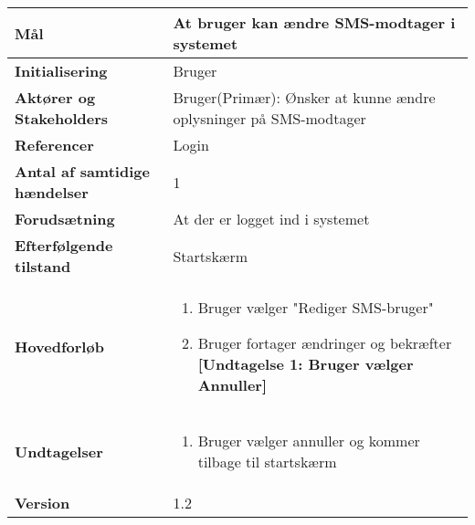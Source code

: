 \begin{table}[H] \centering
\begin{tabular}{|p{6cm}|p{8cm}|}
	\hline
\textbf{Mål} &
At bruger kan ændre SMS-modtager i systemet\\\hline

\textbf{Initialisering} &
  Bruger \\\hline
 
\textbf{Aktører og Stakeholders} &
Bruger(Primær): Ønsker at kunne ændre oplysninger på SMS-modtager  \\\hline

\textbf{Referencer} &
Login  \\\hline

\textbf{Antal af samtidige hændelser} &
1  \\\hline

\textbf{Forudsætning} &
At der er logget ind i systemet  \\\hline

\textbf{Efterfølgende tilstand} &
Startskærm  \\\hline

\textbf{Hovedforløb} &
\begin{enumerate}

\item Bruger vælger "Rediger SMS-bruger"
\item Bruger fortager ændringer og bekræfter \newline
\textbf{[Undtagelse 1: Bruger vælger Annuller]}

\end{enumerate}   
 \\\hline
 
\textbf{Undtagelser}
&\begin{enumerate}[label= \ref{UC8und1}a.]
\item Bruger vælger annuller og kommer tilbage til startskærm
\end{enumerate}
 \\\hline
 
		\textbf{Version}		&1.2 \\\hline
	\end{tabular}
	\label{UC6} 
\end{table}